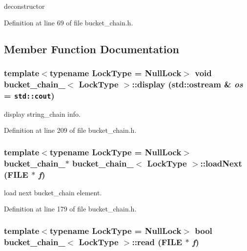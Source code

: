 deconstructor 

Definition at line 69 of file bucket\_\-chain.h.

\subsection{Member Function Documentation}
\hypertarget{classbucket__chain___ff30da7f833bbe9b05c523d23658bf1e}{
\subsubsection[{display}]{\setlength{\rightskip}{0pt plus 5cm}template$<$typename LockType  = NullLock$>$ void {\bf bucket\_\-chain\_\-}$<$ LockType $>$::display (std::ostream \& {\em os} = {\tt std::cout})}}
\label{classbucket__chain___ff30da7f833bbe9b05c523d23658bf1e}


display string\_\-chain info. 

Definition at line 209 of file bucket\_\-chain.h.\hypertarget{classbucket__chain___b981d355afb14f9667b6593d8bfed523}{
\subsubsection[{loadNext}]{\setlength{\rightskip}{0pt plus 5cm}template$<$typename LockType  = NullLock$>$ {\bf bucket\_\-chain\_\-}$\ast$ {\bf bucket\_\-chain\_\-}$<$ LockType $>$::loadNext (FILE $\ast$ {\em f})}}
\label{classbucket__chain___b981d355afb14f9667b6593d8bfed523}


load next bucket\_\-chain element. 

Definition at line 179 of file bucket\_\-chain.h.\hypertarget{classbucket__chain___1e08721b9b46d46aaabb41b4adc9e559}{
\subsubsection[{read}]{\setlength{\rightskip}{0pt plus 5cm}template$<$typename LockType  = NullLock$>$ bool {\bf bucket\_\-chain\_\-}$<$ LockType $>$::read (FILE $\ast$ {\em f})}}
\label{classbucket__chain___1e08721b9b46d46aaabb41b4adc9e559}


